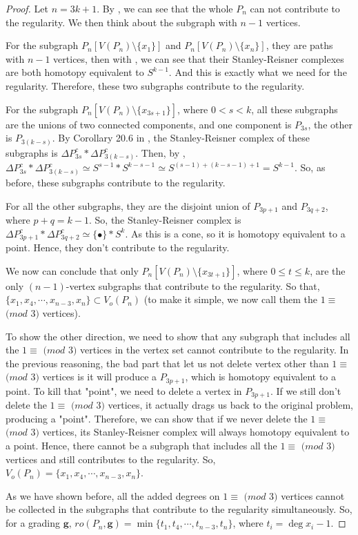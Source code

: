 \documentclass[dvipsnames,10pt]{article}
\begin{document}
\begin{proof}
    Let $n=3k+1$. By , we can see that the whole $P_n$ can not contribute to the regularity. We then think about the subgraph with $n-1$ vertices.

    For the subgraph $P_n[V(P_n)\setminus\{x_1\}]$ and $P_n[V(P_n)\setminus\{x_n\}]$, they are paths with $n-1$ vertices, then with , we can see that their Stanley-Reisner complexes are both homotopy equivalent to $S^{k-1}$. And this is exactly what we need for the regularity. Therefore, these two subgraphs contribute to the regularity.

    For the subgraph $P_n[V(P_n)\setminus\{x_{3s+1}\}]$, where $0< s< k$, all these subgraphs are the unions of two connected components, and one component is $P_{3s}$, the other is $P_{3(k-s)}$. By Corollary 20.6 in \cite{kozlov2008combinatorial}, the Stanley-Reisner complex of these subgraphs is $\Delta P_{3s}^c\ast\Delta P_{3(k-s)}^c$. Then, by , $\Delta P_{3s}^c\ast\Delta P_{3(k-s)}^c\simeq S^{s-1}\ast S^{k-s-1}\simeq S^{(s-1)+(k-s-1)+1}=S^{k-1}$. So, as before, these subgraphs contribute to the regularity.

    For all the other subgraphs, they are the disjoint union of $P_{3p+1}$ and $P_{3q+2}$, where $p+q=k-1$. So, the Stanley-Reisner complex is $\Delta P_{3p+1}^c\ast\Delta P_{3q+2}^c\simeq \{\bullet \}\ast S^{k}$. As this is a cone, so it is homotopy equivalent to a point. Hence, they don't contribute to the regularity.

    We now can conclude that only $P_n[V(P_n)\setminus\{x_{3t+1}\}]$, where $0\leq t\leq k$, are the only $(n-1)$-vertex subgraphs that contribute to the regularity. So that, $\{x_1,x_4,\cdots,x_{n-3},x_n\}\subset V_o(P_n)$ (to make it simple, we now call them the $1\equiv$ $(mod$ $3)$ vertices). 
    
    To show the other direction, we need to show that any subgraph that includes all the $1\equiv$ $(mod$ $3)$ vertices in the vertex set cannot contribute to the regularity. In the previous reasoning, the bad part that let us not delete vertex other than $1\equiv$ $(mod$ $3)$ vertices is it will produce a $P_{3p+1}$, which is homotopy equivalent to a point. To kill that "point", we need to delete a vertex in $P_{3p+1}$. If we still don't delete the $1\equiv$ $(mod$ $3)$ vertices, it actually drags us back to the original problem, producing a "point". Therefore, we can show that if we never delete the $1\equiv$ $(mod$ $3)$ vertices, its Stanley-Reisner complex will always homotopy equivalent to a point. Hence, there cannot be a subgraph that includes all the $1\equiv$ $(mod$ $3)$ vertices and still contributes to the regularity. So, $V_o(P_n)=\{x_1,x_4,\cdots,x_{n-3},x_n\}$.

    As we have shown before, all the added degrees on $1\equiv$ $(mod$ $3)$ vertices cannot be collected in the subgraphs that contribute to the regularity simultaneously. So, for a grading $\mathbf{g}$, $ro(P_n,\mathbf{g})=\min\{t_1,t_4,\cdots,t_{n-3},t_n\}$, where $t_i=\deg x_i-1$.
\end{proof}
    
\end{document}
